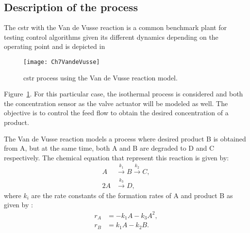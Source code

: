 \subsection{Description of the process}
\label{sec:DescriptionCSTR}

The \gls{cstr} with the Van de Vusse reaction \citep{VandeVusse1964} is a common benchmark plant for testing control algorithms given its different dynamics depending on the operating point and is depicted in %
\begin{figure}[tb]
	\centering
	\texttt{[image: Ch7VandeVusse]}
	\caption{\gls{cstr} process using the Van de Vusse reaction model.}
	\label{fig:Ch7VandeVusse}
\end{figure}
%
Figure~\ref{fig:Ch7VandeVusse}. For this particular case, the isothermal process is considered and both the concentration sensor as the valve actuator will be modeled as well. The objective is to control the feed flow to obtain the desired concentration of a product.

The Van de Vusse reaction models a process where desired product B is obtained from A, but at the same time, both A and B are degraded to D and C respectively. The chemical equation that represent this reaction is given by:
%
\begin{align*}
A &\overset{k_1}{\longrightarrow} B \overset{k_2}{\longrightarrow}C,\\
2 A &\overset{k_3}{\longrightarrow} D,
\end{align*}
%
where $k_i$ are the rate constants of the formation rates of A and product B as given by \citep{VandeVusse1964}:
\begin{equation}
\begin{split}
r_A &= -k_1 A - k_3 A^2,\\
r_B &= k_1 A - k_2 B.
\end{split}
\label{eq:RateVandeVusse}
\end{equation}

